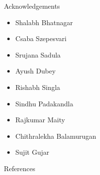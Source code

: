 \documentclass[10pt]{beamer}
\begin{document}
\begin{frame}[fragile]{Acknowledgements}
\begin{itemize}
\item Shalabh Bhatnagar
\item Csaba Szepesvari
\item Srujana Sadula
\item Ayush Dubey
\item Rishabh Singla
\item Sindhu Padakandla
\item Rajkumar Maity
\item Chithralekha Balamurugan
\item Sujit Gujar
\end{itemize}
\end{frame}


\begin{frame}[allowframebreaks]{References}


\end{frame}
\end{document}
